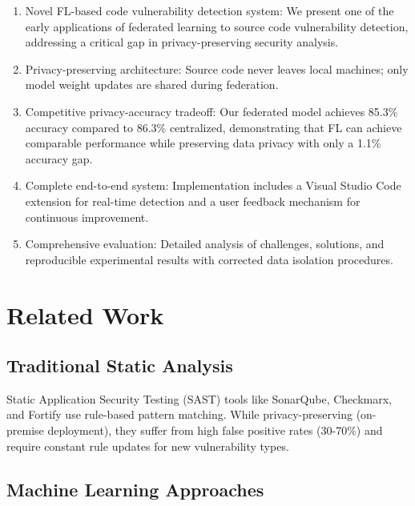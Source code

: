 \documentclass[conference]{IEEEtran}
\begin{document}
\begin{enumerate}
    \item Novel FL-based code vulnerability detection system: We present one of the early applications of federated learning to source code vulnerability detection, addressing a critical gap in privacy-preserving security analysis.
    
    \item Privacy-preserving architecture: Source code never leaves local machines; only model weight updates are shared during federation.
    
    \item Competitive privacy-accuracy tradeoff: Our federated model achieves 85.3\% accuracy compared to 86.3\% centralized, demonstrating that FL can achieve comparable performance while preserving data privacy with only a 1.1\% accuracy gap.
    
    \item Complete end-to-end system: Implementation includes a Visual Studio Code extension for real-time detection and a user feedback mechanism for continuous improvement.
    
    \item Comprehensive evaluation: Detailed analysis of challenges, solutions, and reproducible experimental results with corrected data isolation procedures.
\end{enumerate}

\section{Related Work}

\subsection{Traditional Static Analysis}

Static Application Security Testing (SAST) tools like SonarQube, Checkmarx, and Fortify use rule-based pattern matching. While privacy-preserving (on-premise deployment), they suffer from high false positive rates (30-70\%) and require constant rule updates for new vulnerability types.

\subsection{Machine Learning Approaches}
\end{document}
